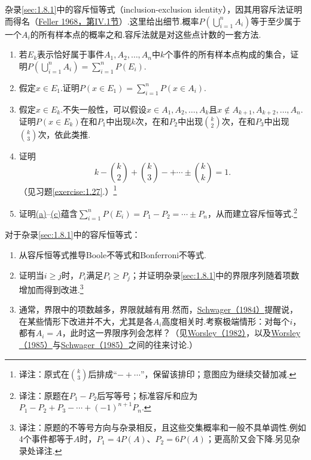\begin{exercise}\label{exercise:1.42}
杂录\ref{sec:1.8.1}中的容斥恒等式（inclusion-exclusion identity），因其用容斥法证明而得名（\hyperref[bib:source118]{Feller 1968，第IV.1节}）.这里给出细节.概率$P(\bigcup_{i=1}^n A_i)$等于至少属于一个$A_i$的所有样本点的概率之和.容斥法就是对这些点计数的一套方法.
\begin{enumerate}
\item[(a)]\label{itm:exercise:1.42:a} 若$E_k$表示恰好属于事件$A_1,A_2,\ldots,A_n$中$k$个事件的所有样本点构成的集合，证明$P(\bigcup_{i=1}^n A_i)=\sum_{i=1}^n P(E_i)$.
\item[(b)] 假定$x\in E_1$.证明$P(x\in E_1)=\sum_{i=1}^n P(x\in A_i)$.
\item[(c)]\label{itm:exercise:1.42:c} 假定$x\in E_k$.不失一般性，可以假设$x\in A_1,A_2,\ldots,A_k$且$x\notin A_{k+1},A_{k+2},\ldots,A_n$.证明$P(x\in E_k)$在和$P_1$中出现$k$次，在和$P_2$中出现$\binom k2$次，在和$P_3$中出现$\binom k3$次，依此类推.
\item[(d)] 证明
$$
k-\binom k2+\binom k3-+\cdots\pm\binom kk=1.
$$
（见习题\ref{exercise:1.27}.）\footnote{译注：原式在$\binom k3$后排成“$-+\cdots$”，保留该排印；意图应为继续交替加减.}
\item[(e)] 证明\hyperref[itm:exercise:1.42:a]{(a)}–\hyperref[itm:exercise:1.42:c]{(c)}蕴含$\sum_{i=1}^n P(E_i)=P_1-P_2=\cdots\pm P_n$，从而建立容斥恒等式.\footnote{译注：原题在$P_1-P_2$后写等号；标准容斥和应为$P_1-P_2+P_3-\cdots+(-1)^{n+1}P_n$.}
\end{enumerate}
\end{exercise}



\begin{exercise}\label{exercise:1.43}
对于杂录\ref{sec:1.8.1}中的容斥恒等式：
\begin{enumerate}
\item[(a)] 从容斥恒等式推导Boole不等式和Bonferroni不等式.
\item[(b)] 证明当$i\ge j$时，$P_i$满足$P_i\ge P_j$；并证明杂录\ref{sec:1.8.1}中的界限序列随着项数增加而得到改进.\footnote{译注：原题的不等号方向与杂录相反，且这些交集概率和一般不具单调性.例如4个事件都等于$A$时，$P_1=4P(A)$、$P_2=6P(A)$；更高阶又会下降.另见杂录处译注.}
\item[(c)] 通常，界限中的项数越多，界限就越有用.然而，\hyperref[bib:source279]{Schwager（1984）}提醒说，在某些情形下改进并不大，尤其是各$A_i$高度相关时.考察极端情形：对每个$i$，都有$A_i=A$，此时这一界限序列会怎样？（见\hyperref[bib:source332]{Worsley（1982）}，以及\hyperref[bib:source333]{Worsley（1985）}与\hyperref[bib:source280]{Schwager（1985）}之间的往来讨论.）
\end{enumerate}
\end{exercise}

